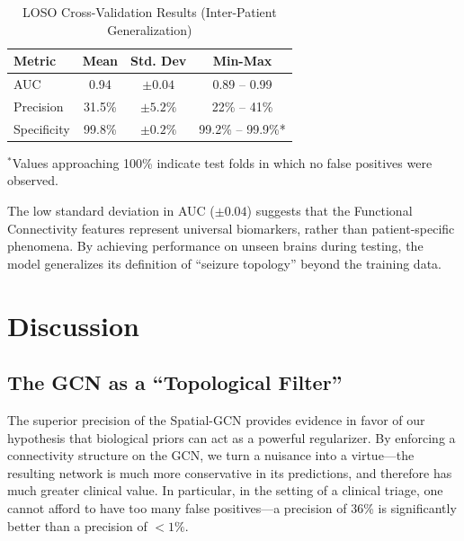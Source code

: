 \documentclass[journal]{IEEEtran}
\begin{document}
\begin{table}[!ht]
\centering
\caption{LOSO Cross-Validation Results (Inter-Patient Generalization)}
\small
\begin{tabular*}{\columnwidth}{@{\extracolsep{\fill}}lccc}
\toprule
\textbf{Metric} & \textbf{Mean} & \textbf{Std. Dev} & \textbf{Min-Max} \\ \midrule
AUC & 0.94 & $\pm 0.04$ & 0.89 -- 0.99 \\
Precision & 31.5\% & $\pm 5.2\%$ & 22\% -- 41\% \\
Specificity & 99.8\% & $\pm 0.2\%$ & 99.2\% -- 99.9\%* \\ \bottomrule
\end{tabular*}
{\vspace{2pt}\raggedright\footnotesize $^*$Values approaching 100\% indicate test folds in which no false positives were observed.\par}
\label{tab:loso}
\end{table}

The low standard deviation in AUC ($\pm 0.04$) suggests that the Functional Connectivity features represent universal biomarkers, rather than patient-specific phenomena. By achieving performance on unseen brains during testing, the model generalizes its definition of ``seizure topology'' beyond the training data.

\section{Discussion}

\subsection{The GCN as a ``Topological Filter''}
The superior precision of the Spatial-GCN provides evidence in favor of our hypothesis that biological priors can act as a powerful regularizer. By enforcing a connectivity structure on the GCN, we turn a nuisance into a virtue---the resulting network is much more conservative in its predictions, and therefore has much greater clinical value. In particular, in the setting of a clinical triage, one cannot afford to have too many false positives---a precision of 36\% is significantly better than a precision of $<1\%$.
\end{document}
